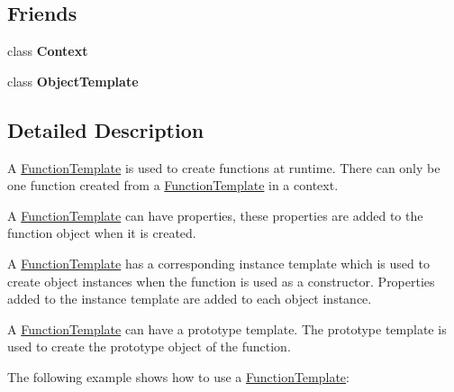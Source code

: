 \subsection*{Friends}
\begin{DoxyCompactItemize}
\item 
\hypertarget{classv8_1_1_function_template_ac26c806e60ca4a0547680edb68f6e39b}{}class {\bfseries Context}\label{classv8_1_1_function_template_ac26c806e60ca4a0547680edb68f6e39b}

\item 
\hypertarget{classv8_1_1_function_template_a4d28646409234f556983be8a96c06424}{}class {\bfseries Object\+Template}\label{classv8_1_1_function_template_a4d28646409234f556983be8a96c06424}

\end{DoxyCompactItemize}


\subsection{Detailed Description}
A \hyperlink{classv8_1_1_function_template}{Function\+Template} is used to create functions at runtime. There can only be one function created from a \hyperlink{classv8_1_1_function_template}{Function\+Template} in a context.

A \hyperlink{classv8_1_1_function_template}{Function\+Template} can have properties, these properties are added to the function object when it is created.

A \hyperlink{classv8_1_1_function_template}{Function\+Template} has a corresponding instance template which is used to create object instances when the function is used as a constructor. Properties added to the instance template are added to each object instance.

A \hyperlink{classv8_1_1_function_template}{Function\+Template} can have a prototype template. The prototype template is used to create the prototype object of the function.

The following example shows how to use a \hyperlink{classv8_1_1_function_template}{Function\+Template}\+:


